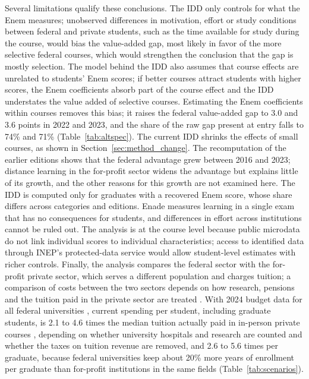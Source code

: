 \documentclass[11pt,a4paper]{article}
\begin{document}
Several limitations qualify these conclusions. The IDD only controls for what the Enem measures; unobserved differences in motivation, effort or study conditions between federal and private students, such as the time available for study during the course, would bias the value-added gap, most likely in favor of the more selective federal courses, which would strengthen the conclusion that the gap is mostly selection. The model behind the IDD also assumes that course effects are unrelated to students' Enem scores; if better courses attract students with higher scores, the Enem coefficients absorb part of the course effect and the IDD understates the value added of selective courses. Estimating the Enem coefficients within courses removes this bias; it raises the federal value-added gap to 3.0 and 3.6 points in 2022 and 2023, and the share of the raw gap present at entry falls to 74\% and 71\% (Table~\ref{tab:altspec}). The current IDD shrinks the effects of small courses, as shown in Section~\ref{sec:method_change}. The recomputation of the earlier editions shows that the federal advantage grew between 2016 and 2023; distance learning in the for-profit sector widens the advantage but explains little of its growth, and the other reasons for this growth are not examined here. The IDD is computed only for graduates with a recovered Enem score, whose share differs across categories and editions. Enade measures learning in a single exam that has no consequences for students, and differences in effort across institutions cannot be ruled out. The analysis is at the course level because public microdata do not link individual scores to individual characteristics; access to identified data through INEP's protected-data service would allow student-level estimates with richer controls. Finally, the analysis compares the federal sector with the for-profit private sector, which serves a different population and charges tuition; a comparison of costs between the two sectors depends on how research, pensions and the tuition paid in the private sector are treated \citep{bielschowsky2022}. With 2024 budget data for all federal universities \citep{cgu2024}, current spending per student, including graduate students, is 2.1 to 4.6 times the median tuition actually paid in in-person private courses \citep{hoper2026}, depending on whether university hospitals and research are counted and whether the taxes on tuition revenue are removed, and 2.6 to 5.6 times per graduate, because federal universities keep about 20\% more years of enrollment per graduate than for-profit institutions in the same fields \citep{inepcenso} (Table~\ref{tab:scenarios}).
\end{document}

